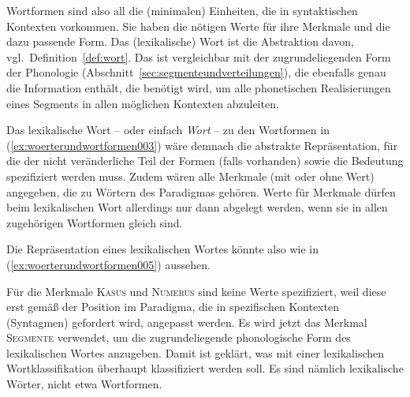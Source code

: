 
Wortformen sind also all die (minimalen) Einheiten, die in syntaktischen Kontexten vorkommen.
Sie haben die nötigen Werte für ihre Merkmale und die dazu passende Form.
Das (lexikalische) Wort ist die Abstraktion davon, vgl.\ Definition~\ref{def:wort}.
Das ist vergleichbar mit der zugrundeliegenden Form der Phonologie (Abschnitt~\ref{sec:segmenteundverteilungen}), die ebenfalls genau die Information enthält, die benötigt wird, um alle phonetischen Realisierungen eines Segments in allen möglichen Kontexten abzuleiten.


Das lexikalische Wort -- oder einfach \textit{Wort} -- zu den Wortformen in (\ref{ex:woerterundwortformen003}) wäre demnach die abstrakte Repräsentation, für die \zB der nicht veränderliche Teil der Formen (falls vorhanden) sowie die Bedeutung spezifiziert werden muss.
Zudem wären alle Merkmale (mit oder ohne Wert) angegeben, die zu Wörtern des Paradigmas gehören.
Werte für Merkmale dürfen beim lexikalischen Wort allerdings nur dann abgelegt werden, wenn sie in allen zugehörigen Wortformen gleich sind.

Die Repräsentation eines lexikalischen Wortes könnte also wie in (\ref{ex:woerterundwortformen005}) aussehen.

\begin{exe}
\end{exe}

Für die Merkmale \textsc{Kasus} und \textsc{Numerus} sind keine Werte spezifiziert, weil diese erst gemäß der Position im Paradigma, die in spezifischen Kontexten (Syntagmen) gefordert wird, angepasst werden.
Es wird jetzt das Merkmal \textsc{Segmente} verwendet, um die zugrundeliegende phonologische Form des lexikalischen Wortes anzugeben.
Damit ist geklärt, was mit einer lexikalischen Wortklassifikation überhaupt klassifiziert werden soll.
Es sind nämlich lexikalische Wörter, nicht etwa Wortformen.

